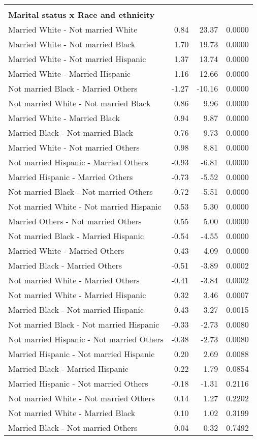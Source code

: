 \begin{center}
\begin{longtable}{lrrr}
{\bf{  }} & & & \\
{\bf{Marital status x Race and ethnicity}} & & & \\
\hline
    Married White -  Not married White & 0.84 & 23.37 & 0.0000 \\ 
    Married White -  Not married Black & 1.70 & 19.73 & 0.0000 \\ 
    Married White -  Not married Hispanic & 1.37 & 13.74 & 0.0000 \\ 
    Married White -  Married Hispanic & 1.16 & 12.66 & 0.0000 \\ 
    Not married Black -  Married Others & -1.27 & -10.16 & 0.0000 \\ 
    Not married White -  Not married Black & 0.86 & 9.96 & 0.0000 \\ 
    Married White -  Married Black & 0.94 & 9.87 & 0.0000 \\ 
    Married Black -  Not married Black & 0.76 & 9.73 & 0.0000 \\ 
    Married White -  Not married Others & 0.98 & 8.81 & 0.0000 \\ 
    Not married Hispanic -  Married Others & -0.93 & -6.81 & 0.0000 \\ 
    Married Hispanic -  Married Others & -0.73 & -5.52 & 0.0000 \\ 
    Not married Black -  Not married Others & -0.72 & -5.51 & 0.0000 \\ 
    Not married White -  Not married Hispanic & 0.53 & 5.30 & 0.0000 \\ 
    Married Others -  Not married Others & 0.55 & 5.00 & 0.0000 \\ 
    Not married Black -  Married Hispanic & -0.54 & -4.55 & 0.0000 \\ 
    Married White -  Married Others & 0.43 & 4.09 & 0.0000 \\ 
    Married Black -  Married Others & -0.51 & -3.89 & 0.0002 \\ 
    Not married White -  Married Others & -0.41 & -3.84 & 0.0002 \\ 
    Not married White -  Married Hispanic & 0.32 & 3.46 & 0.0007 \\ 
    Married Black -  Not married Hispanic & 0.43 & 3.27 & 0.0015 \\ 
    Not married Black -  Not married Hispanic & -0.33 & -2.73 & 0.0080 \\ 
    Not married Hispanic -  Not married Others & -0.38 & -2.73 & 0.0080 \\ 
    Married Hispanic -  Not married Hispanic & 0.20 & 2.69 & 0.0088 \\ 
    Married Black -  Married Hispanic & 0.22 & 1.79 & 0.0854 \\ 
    Married Hispanic -  Not married Others & -0.18 & -1.31 & 0.2116 \\ 
    Not married White -  Not married Others & 0.14 & 1.27 & 0.2202 \\ 
    Not married White -  Married Black & 0.10 & 1.02 & 0.3199 \\ 
    Married Black -  Not married Others & 0.04 & 0.32 & 0.7492 \\ 


\end{longtable}
\end{center}
